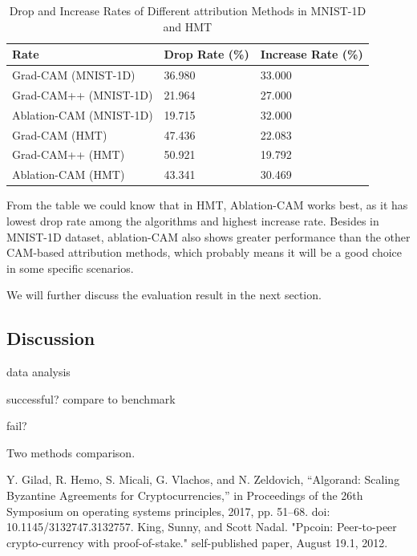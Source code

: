 \documentclass[conference]{IEEEtran}
\begin{document}
\begin{table}[h]
\caption{Drop and Increase Rates of Different attribution Methods in MNIST-1D and HMT}
\begin{tabular}{|l|l|l|}
\hline
Rate                    & Drop Rate (\%) & Increase Rate (\%) \\ \hline
Grad-CAM (MNIST-1D)     & 36.980         & 33.000             \\ \hline
Grad-CAM++ (MNIST-1D)   & 21.964         & 27.000             \\ \hline
Ablation-CAM (MNIST-1D) & 19.715         & 32.000             \\ \hline
Grad-CAM (HMT)          & 47.436         & 22.083             \\ \hline
Grad-CAM++ (HMT)        & 50.921         & 19.792             \\ \hline
Ablation-CAM (HMT)      & 43.341         & 30.469             \\ \hline
\end{tabular}
\end{table}

From the table we could know that in HMT, Ablation-CAM works best, as it has lowest drop rate among the algorithms and highest increase rate. Besides in MNIST-1D dataset, ablation-CAM also shows greater performance than the other CAM-based attribution methods, which probably means it will be a good choice in some specific scenarios.\par
We will further discuss the evaluation result in the next section.

\subsection{Discussion}

data analysis

successful? compare to benchmark

fail?

Two methods comparison.

\begin{thebibliography}{00}
Y. Gilad, R. Hemo, S. Micali, G. Vlachos, and N. Zeldovich, “Algorand: Scaling Byzantine Agreements for Cryptocurrencies,” in Proceedings of the 26th Symposium on operating systems principles, 2017, pp. 51–68. doi: 10.1145/3132747.3132757.
 King, Sunny, and Scott Nadal. "Ppcoin: Peer-to-peer crypto-currency with proof-of-stake." self-published paper, August 19.1, 2012.

\end{thebibliography}
\end{document}

